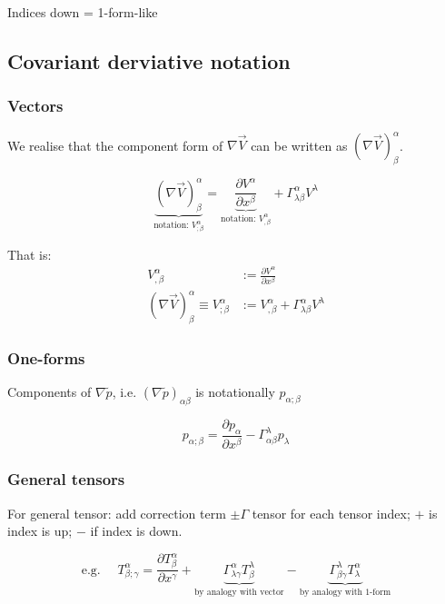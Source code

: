 \documentclass[a4paper]{article} %
\renewcommand{\tilde}{\widetilde}
\begin{document}
Indices down = 1-form-like

\subsection{Covariant derviative notation}
\subsubsection{Vectors}
We realise that the component form of $\nabla \vec{V}$ can be written as $(\nabla \vec{V})^{\alpha}_{\beta}$.

\begin{equation}
\underbrace{(\nabla \vec{V})^{\alpha}_{\beta}}_{\text{notation: }V^{\alpha}_{;\beta}}=
\underbrace{\frac{\partial V^{\alpha}}{\partial x^{\beta}}}_{\text{notation: }V^{\alpha}_{,\beta}}
+\Gamma^{\alpha}_{\lambda\beta}V^{\lambda}
\end{equation}

That is:
\begin{align}
V^{\alpha}_{,\beta}&:=\frac{\partial V^{\alpha}}{\partial x^{\beta}}\\
(\nabla \vec{V})^{\alpha}_{\beta}\equiv V^{\alpha}_{;\beta}&:=V^{\alpha}_{,\beta}+\Gamma^{\alpha}_{\lambda\beta}V^{\lambda}
\end{align}

\subsubsection{One-forms}
Components of $\nabla\tilde{p}$, i.e. $(\nabla\tilde{p})_{\alpha\beta}$ is notationally $p_{\alpha;\beta}$

\begin{equation}
p_{\alpha;\beta}=\frac{\partial p_{\alpha}}{\partial x^{\beta}}-\Gamma^{\lambda}_{\alpha\beta} p_{\lambda}
\end{equation}

\subsubsection{General tensors}
For general tensor: add correction term $\pm \Gamma$ tensor for each tensor index; $+$ is index is up; $-$ if index is down.

\begin{equation}
\text{e.g. }\quad T^{\alpha}_{\beta;\gamma}=\frac{\partial T^{\alpha}_{\beta}}{\partial x^{\gamma}}
+\underbrace{\Gamma^{\alpha}_{\lambda\gamma} T^{\lambda}_{\beta}}_{\text{by analogy with vector}}
-\underbrace{\Gamma^{\lambda}_{\beta \gamma}T^{\alpha}_{\lambda}}_{\text{by analogy with 1-form}}
\end{equation}
\end{document}
